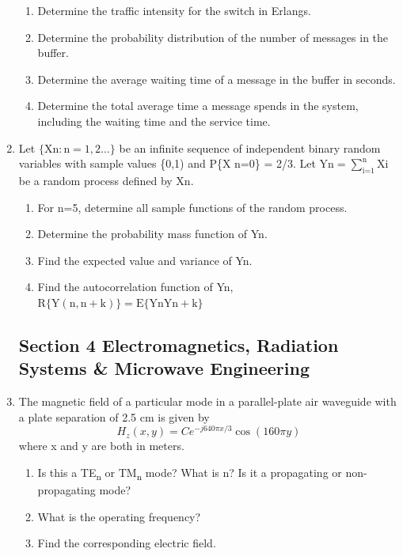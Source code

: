 \documentclass[main.tex]{subfiles}
\begin{document}
\begin{enumerate}
    \begin{enumerate}
        \item Determine the traffic intensity for the switch in Erlangs.
        \item Determine the probability distribution of the number of messages in the buffer.
        \item Determine the average waiting time of a message in the buffer in seconds.
        \item Determine the total average time a message spends in the system, including the waiting time and the service time.
    \end{enumerate}

\item Let $\{\mathrm{Xn}: \mathrm{n}=1,2 \ldots\}$ be an infinite sequence of independent binary random variables with sample values \{0,1) and P\{X n=0\} = 2/3. Let $\text{Yn}=\sum_{\text{i=1}}^{\text{n}} \text{Xi}$ be a random process defined by Xn.

    \begin{enumerate}
        \item For n=5, determine all sample functions of the random process.
        \item Determine the probability mass function of Yn.
        \item Find the expected value and variance of Yn.
        \item Find the autocorrelation function of Yn, $\mathrm{R}\{\mathrm{Y}(\mathrm{n}, \mathrm{n}+\mathrm{k})\}=\mathrm{E}\{\mathrm{Yn} \mathrm{Yn}+\mathrm{k}\}$
    \end{enumerate}
    
\subsection{Section 4 Electromagnetics, Radiation Systems \& Microwave Engineering}

\item The magnetic field of a particular mode in a parallel-plate air waveguide with a plate separation of 2.5 cm is given by
$$H_{z}(x, y)=C e^{-j 640 \pi x / 3} \cos (160 \pi y)$$
where x and y are both in meters.
    
    \begin{enumerate}
        \item Is this a TE\textsubscript{n} or TM\textsubscript{n} mode? What is n? Is it a propagating or non-propagating mode?
        \item What is the operating frequency?
        \item Find the corresponding electric field.
    \end{enumerate}
    

\end{enumerate}
\end{document}
